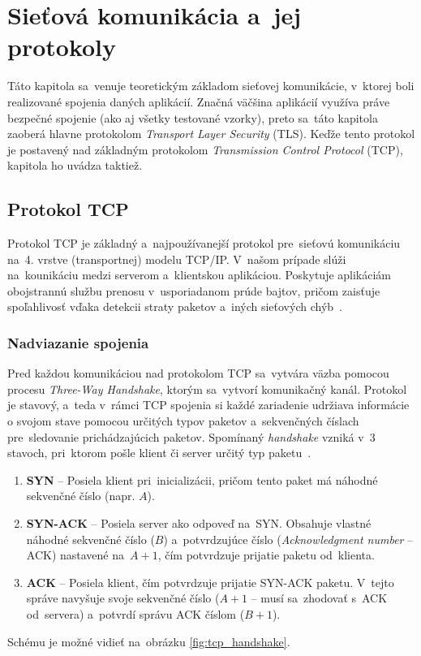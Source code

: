 \chapter{Sieťová komunikácia a~jej protokoly} 

Táto kapitola sa~venuje teoretickým základom sieťovej komunikácie, v~ktorej boli realizované spojenia daných aplikácií. Značná väčšina aplikácií využíva práve bezpečné spojenie (ako aj všetky testované vzorky), preto sa~táto kapitola zaoberá hlavne protokolom \textit{Transport Layer Security} (TLS). Keďže tento protokol je postavený nad základným protokolom \textit{Transmission Control Protocol} (TCP), kapitola ho uvádza taktiež. 

\section{Protokol TCP}
Protokol TCP je základný a~najpoužívanejší protokol pre~sieťovú komunikáciu na~4. vrstve (transportnej) modelu TCP/IP. V~našom prípade slúži na~kounikáciu medzi serverom a~klientskou aplikáciou. Poskytuje aplikáciám obojstrannú službu prenosu v~usporiadanom prúde bajtov, pričom zaisťuje spoľahlivosť vďaka detekcii straty paketov a~iných sieťových chýb~\cite{rfc9293}.

\subsection{Nadviazanie spojenia}\label{th:TCPHandshake}
Pred každou komunikáciou nad protokolom TCP sa~vytvára väzba pomocou procesu \textit{Three-Way Handshake}, ktorým sa~vytvorí komunikačný kanál. Protokol je stavový, a~teda v~rámci TCP spojenia si každé zariadenie udržiava informácie o svojom stave pomocou určitých typov paketov a~sekvenčných číslach pre~sledovanie prichádzajúcich paketov. Spomínaný \textit{handshake} vzniká v~3 stavoch, pri~ktorom pošle klient či server určitý typ paketu~\cite{hsu2016trap}.
\begin{enumerate}
    \item \textbf{SYN} -- Posiela klient pri~inicializácii, pričom tento paket má náhodné sekvenčné číslo (napr. $A$).
    \item \textbf{SYN-ACK} -- Posiela server ako odpoveď na~SYN. Obsahuje vlastné náhodné sekvenčné číslo ($B$) a~potvrdzujúce číslo (\textit{Acknowledgment number} -- ACK) nastavené na~$A+1$, čím potvrdzuje prijatie paketu od~klienta.
    \item \textbf{ACK} -- Posiela klient, čím potvrdzuje prijatie SYN-ACK paketu. V~tejto správe navyšuje svoje sekvenčné číslo ($A + 1$ -- musí sa~zhodovať s~ACK od~servera) a~potvrdí správu ACK číslom ($B + 1$).
\end{enumerate}
Schému je možné vidieť na~obrázku \ref{fig:tcp_handshake}.

